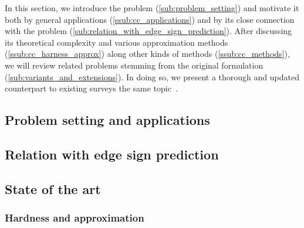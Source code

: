 
In this section, we introduce the \pcc{} problem (\autoref{sub:problem_setting}) and motivate it
both by general applications (\autoref{ssub:cc_applications}) and by its close connection with the
\esp{} problem (\autoref{sub:relation_with_edge_sign_prediction}). After discussing its theoretical
complexity and various approximation methods (\autoref{ssub:cc_harness_approx}) along other kinds of
methods (\autoref{ssub:cc_methods}), we will review related problems stemming from the original
formulation (\autoref{sub:variants_and_extensions}). In doing so, we present a thorough and updated
counterpart to existing surveys the same
topic~\autocites{bonchi2014correlation}{surveyCC16}{CCWirth2017}.

\subsection{Problem setting and applications}
\label{sub:problem_setting}


\subsection{Relation with edge sign prediction}
\label{sub:relation_with_edge_sign_prediction}


\subsection{State of the art}
\label{sub:state_of_the_art}

\subsubsection{Hardness and approximation}
\label{ssub:cc_harness_approx}

